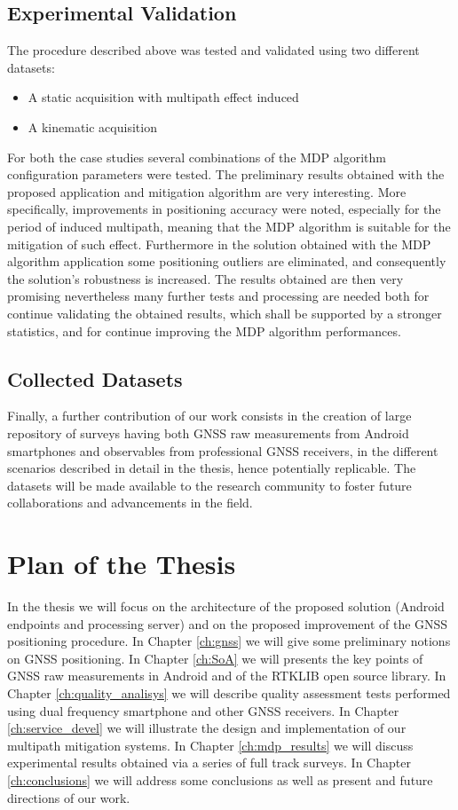 \subsection*{Experimental Validation}
%

The procedure described above was tested and validated using two different datasets:
\begin{itemize}
\item A static acquisition with multipath effect induced
\item A kinematic acquisition
\end{itemize}
For both the case studies several combinations of the MDP algorithm configuration parameters were tested.
The preliminary results obtained with the proposed application and mitigation algorithm are very interesting.
More specifically, improvements in positioning accuracy were noted, especially for the period of induced multipath, meaning that the MDP algorithm is suitable for the mitigation of such effect. Furthermore in the solution obtained with the MDP algorithm application some positioning outliers are eliminated, and consequently the solution's robustness is increased. 
The results obtained are then very promising nevertheless many further tests and processing are needed both for continue validating the obtained results, which shall be supported by a stronger statistics, and for continue improving the MDP algorithm performances. 
%
\subsection*{Collected Datasets}
Finally, a further contribution of our work consists in the creation 
of large repository of surveys having both GNSS raw measurements from Android smartphones and observables from professional GNSS receivers, in the different scenarios described in detail in the thesis, hence potentially replicable. The datasets will be made available to the research community to foster future collaborations and advancements in the field.
%
\section{Plan of the Thesis}
In the thesis we will focus on the architecture of the proposed solution (Android endpoints and processing server) and on the proposed improvement of the GNSS positioning procedure. In Chapter \ref{ch:gnss} we will give some preliminary notions on GNSS positioning. In Chapter \ref{ch:SoA} we will presents the key points of GNSS raw measurements in Android and of the RTKLIB open source library. In Chapter \ref{ch:quality_analisys} we will describe quality assessment tests performed using dual frequency smartphone and other GNSS receivers. In Chapter \ref{ch:service_devel} we will illustrate the design and implementation of our multipath mitigation systems. In Chapter \ref{ch:mdp_results} we will discuss experimental results obtained via a series of full track surveys. In Chapter \ref{ch:conclusions} we will address some conclusions as well as present and future directions of our work.




